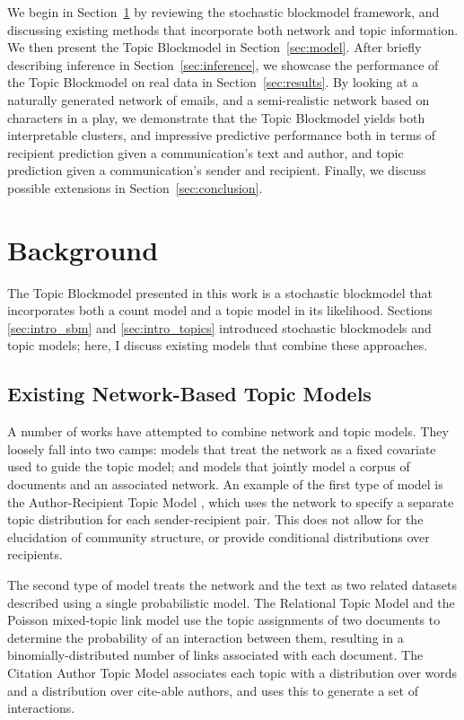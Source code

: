     We begin in Section~\ref{sec:background} by reviewing the stochastic blockmodel framework, and discussing existing methods that incorporate both network and topic information. We then present the Topic Blockmodel in Section~\ref{sec:model}. After briefly describing inference in Section~\ref{sec:inference}, we showcase the performance
    of the Topic Blockmodel on real data in Section~\ref{sec:results}. By looking at a naturally generated network of emails, and a semi-realistic network based on characters in a play, we demonstrate that the Topic Blockmodel yields both interpretable clusters, and impressive predictive performance  both in terms of recipient prediction given a communication's text and author, and topic prediction given a communication's sender and recipient. Finally, we discuss possible extensions in Section~\ref{sec:conclusion}.

\section{Background}\label{sec:background}

    The Topic Blockmodel presented in this work is a stochastic blockmodel that incorporates both a count model and a topic model in its likelihood. Sections \ref{sec:intro_sbm} and \ref{sec:intro_topics} introduced stochastic blockmodels and topic models; here, I discuss existing models that combine these approaches.

    \subsection{Existing Network-Based Topic Models}\label{sec:related}
    
        A number of works have attempted to combine network and topic models. 
        They loosely fall into two camps: models that treat the network as a fixed covariate used to guide the topic model; and models that jointly model a corpus of documents and an associated network. An example of the first type of model is the Author-Recipient Topic Model \citep{mccallum2005}, which uses the network to specify a separate  topic distribution for each sender-recipient pair. This does not allow for the elucidation of community structure, or provide conditional distributions over recipients.
        
        The second type of model treats the network and the text as two related datasets described using a single probabilistic model.
        The Relational Topic Model \citep{rtm} and the Poisson mixed-topic link model \citep{Zhu:Yan:Getoor:Moore:2013} use the topic assignments of two documents to determine the probability of an interaction between them, resulting in a binomially-distributed number of links associated with each document. The Citation Author Topic Model \citep{tu2010} associates each topic with a distribution over words and a distribution over cite-able authors, and uses this to generate a set of interactions.
        
